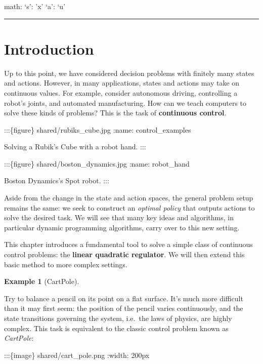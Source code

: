 \documentclass[
  letterpaper,
  DIV=11,
  numbers=noendperiod]{scrreprt}
\theoremstyle{plain}
\theoremstyle{plain}
\theoremstyle{definition}
\newtheorem{example}{Example}[chapter]
\theoremstyle{definition}
\theoremstyle{remark}
\begin{document}
math: `s': 'x' `a': `u'

\begin{center}\rule{0.5\linewidth}{0.5pt}\end{center}

\providecommand{\hi}{h}
\providecommand{\hor}{H}
\providecommand{\kl}[2]{\mathrm{KL}\left(#1\parallel#2\right)}
\providecommand{\ind}[1]{\mathbf{1}\left\{#1\right\}}
\providecommand{\st}{s}
\providecommand{\act}{a}
\providecommand{\E}{\mathbb{E}}
\providecommand{\R}{\mathbb{R}}
\providecommand{\pr}{\mathbb{P}}

\section{Introduction}\label{introduction-2}

Up to this point, we have considered decision problems with finitely
many states and actions. However, in many applications, states and
actions may take on continuous values. For example, consider autonomous
driving, controlling a robot's joints, and automated manufacturing. How
can we teach computers to solve these kinds of problems? This is the
task of \textbf{continuous control}.

:::\{figure\} shared/rubiks\_cube.jpg :name: control\_examples

Solving a Rubik's Cube with a robot hand. :::

:::\{figure\} shared/boston\_dynamics.jpg :name: robot\_hand

Boston Dynamics's Spot robot. :::

Aside from the change in the state and action spaces, the general
problem setup remains the same: we seek to construct an \emph{optimal
policy} that outputs actions to solve the desired task. We will see that
many key ideas and algorithms, in particular dynamic programming
algorithms, carry over to this new setting.

This chapter introduces a fundamental tool to solve a simple class of
continuous control problems: the \textbf{linear quadratic regulator}. We
will then extend this basic method to more complex settings.

\begin{example}[CartPole]\protect\hypertarget{exm-cart_pole}{}\label{exm-cart_pole}

Try to balance a pencil on its point on a flat surface. It's much more
difficult than it may first seem: the position of the pencil varies
continuously, and the state transitions governing the system, i.e.~the
laws of physics, are highly complex. This task is equivalent to the
classic control problem known as \emph{CartPole}:

:::\{image\} shared/cart\_pole.png :width: 200px

\end{example}
\end{document}

